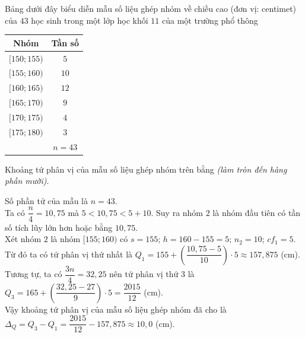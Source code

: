 \begin{ex}%
	Bảng dưới đây biểu diễn mẫu số liệu ghép nhóm về chiều cao (đơn vị: centimet) của $43$ học sinh trong một lớp học khối $11$ của một trường phổ thông
	\begin{center}
		\begin{tabular}{|c|c|}
			\hline
			Nhóm & Tần số \\
			\hline
			$[150;155)$ & $5$ \\
			\hline
			$[155;160)$ & $10$ \\
			\hline
			$[160;165)$ & $12$ \\
			\hline
			$[165;170)$ & $9$ \\
			\hline
			$[170;175)$ & $4$ \\
			\hline
			$[175;180)$ & $3$ \\
			\hline
			& $n=43$ \\
			\hline
		\end{tabular}
	\end{center}
	Khoảng tứ phân vị của mẫu số liệu ghép nhóm trên bằng \textit{(làm tròn đến hàng phần mười)}.
	
	\loigiai
	{
		Số phần tử của mẫu là $n=43$.\\
		Ta có $\dfrac{n}{4}=10{,}75$ mà $5< 10{,}75< 5+10$. Suy ra nhóm $2$ là nhóm đầu tiên có tần số tích lũy lớn hơn hoặc bằng $10{,}75$.\\
		Xét nhóm $2$ là nhóm $[155;160)$ có $s=155$; $h=160-155=5$; $n_2=10$; $cf_1=5$.\\
		Từ đó ta có tứ phân vị thứ nhất là $Q_1=155+\left(\dfrac{10{,}75-5}{10} \right)\cdot 5\approx 157{,}875$ (cm).\\
		Tương tự, ta có  $\dfrac{3n}{4}=32{,}25$ nên tứ phân vị thứ $3$ là\\ $Q_3=165+\left(\dfrac{32{,}25-27}{9} \right)\cdot 5=\dfrac {2015}{12}$ (cm).\\
		Vậy khoảng tứ phân vị của mẫu số liệu ghép nhóm đã cho là\\ $\Delta_Q=Q_3-Q_1= \dfrac {2015}{12}-157{,}875\approx 10{,}0$ (cm).
	}
\end{ex}

